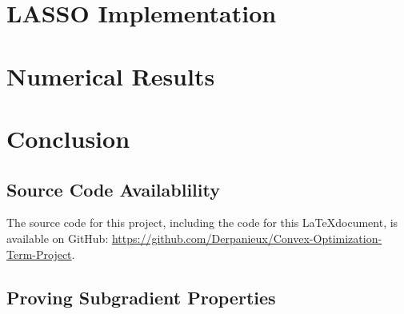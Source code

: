 \documentclass[journal,onecolumn]{IEEEtran}
\begin{document}
\section{LASSO Implementation}\label{sec:lasso}

\section{Numerical Results}\label{sec:results}

\section{Conclusion}\label{sec:conclusion}

\appendix
\subsection{Source Code Availablility}\label{sec:github}
The source code for this project, including the code for this \LaTeX document, is available on GitHub: \url{https://github.com/Derpanieux/Convex-Optimization-Term-Project}.
\subsection{Proving Subgradient Properties}\label{sec:subgradient properties proofs}
\end{document}
